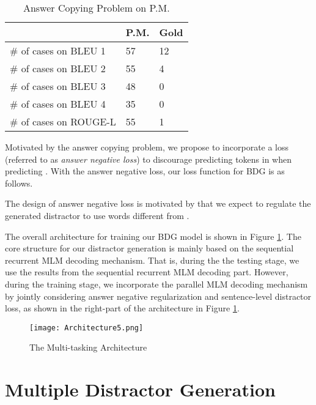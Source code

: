 \documentclass[11pt,a4paper]{article}
\begin{document}
\begin{table}
\centering
    \begin{tabular}{|l|l|l|}
    \hline
     & P.M. & Gold \\ 
    \hline
    \# of cases on BLEU 1   & 57 & 12 \\ \hline
    \# of cases on BLEU 2   & 55 & 4 \\ \hline
    \# of cases on BLEU 3   & 48 & 0 \\ \hline
    \# of cases on BLEU 4   & 35 & 0 \\ \hline
    \# of cases on ROUGE-L   & 55 & 1 \\\hline
    \end{tabular}
    \caption{Answer Copying Problem on P.M.}
    \label{tab:ARPM}
\end{table}

Motivated by the answer copying problem, we propose to incorporate a loss (referred to as \textit{answer negative loss}) to discourage predicting tokens in  when predicting . With the answer negative loss, our loss function for BDG is as follows.












The design of answer negative loss is motivated by that we expect to regulate the generated distractor  to use words different from .

The overall architecture for training our BDG model is shown in Figure \ref{fig:Multi_task}. The core structure for our distractor generation is mainly based on the sequential recurrent MLM decoding mechanism. That is, during the the testing stage, we use the results from the sequential recurrent MLM decoding part. However, during the training stage, we incorporate the parallel MLM decoding mechanism by jointly considering answer negative regularization and sentence-level distractor loss, as shown in the right-part of the architecture in Figure \ref{fig:Multi_task}. 


\begin{figure}[t]
    \centering
    \texttt{[image: Architecture5.png]}
    \caption{The Multi-tasking Architecture}
    \label{fig:Multi_task}
\end{figure}



\section{Multiple Distractor Generation}\label{sec:MDG}
\end{document}
